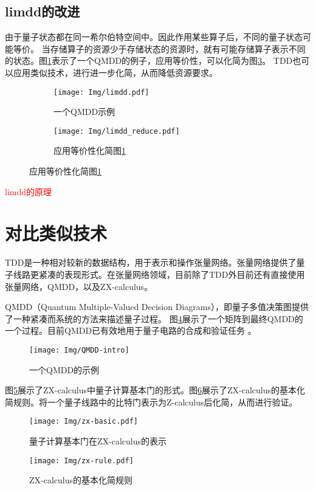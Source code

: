 \subsection*{limdd的改进}
由于量子状态都在同一希尔伯特空间中。因此作用某些算子后，不同的量子状态可能等价。
当存储算子的资源少于存储状态的资源时，就有可能存储算子表示不同的状态\citep{vinkhuijzen2023limdd}。图\ref{fig:qmdd-example}表示了一个QMDD的例子，应用等价性，可以化简为图\ref{fig:limdd-example}。
TDD也可以应用类似技术，进行进一步化简，从而降低资源要求。
\begin{figure}[!htbp]
    \centering
    \begin{subfigure}[b]{.4\textwidth}
        \centering
        \texttt{[image: Img/limdd.pdf]}
        \caption{一个QMDD示例}
        \label{fig:qmdd-example}
    \end{subfigure}
    \begin{subfigure}[b]{.4\textwidth}
        \centering
        \texttt{[image: Img/limdd\_reduce.pdf]}
        \caption{应用等价性化简图\ref{fig:qmdd-example}}
        \label{fig:limdd-example}
    \end{subfigure}
\end{figure}
\textcolor{red}{limdd的原理}

\section{对比类似技术}
TDD是一种相对较新的数据结构，用于表示和操作张量网络。张量网络提供了量子线路更紧凑的表现形式。在张量网络领域，目前除了TDD外目前还有直接使用张量网络，QMDD\citep{1623982}，以及ZX-calculus\citep{van2020zx}。

QMDD（Quantum Multiple-Valued Decision Diagrams），即量子多值决策图提供了一种紧凑而系统的方法来描述量子过程。
图\ref{fig:qmdd-basic}展示了一个矩阵到最终QMDD的一个过程。目前QMDD已有效地用于量子电路的合成\citep{niemann2020advanced}和验证任务
\citep{burgholzer2020verifying,burgholzer2020advanced}。
\begin{figure}[!htbp]
    \centering
    \texttt{[image: Img/QMDD-intro]}
    \caption{一个QMDD的示例}
    \label{fig:qmdd-basic}
\end{figure}

图\ref{fig:zx-basic}展示了ZX-calculus中量子计算基本门的形式。图\ref{fig:zx-rule}展示了ZX-calculus的基本化简规则。将一个量子线路中的比特门表示为Z-calculus后化简，从而进行验证。

\begin{figure}[!htbp]
    \centering
    \texttt{[image: Img/zx-basic.pdf]}
    \caption{量子计算基本门在ZX-calculus的表示}
    \label{fig:zx-basic}
\end{figure}
\begin{figure}[!htbp]
    \centering
    \texttt{[image: Img/zx-rule.pdf]}
    \caption{ZX-calculus的基本化简规则}
    \label{fig:zx-rule}
\end{figure}
 
